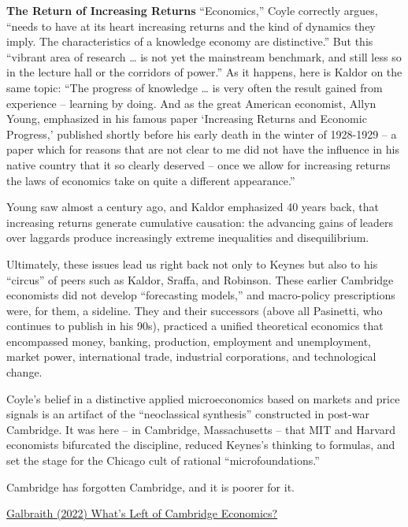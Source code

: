 \documentclass[
]{book}
\begin{document}
\textbf{The Return of Increasing Returns}
``Economics,'' Coyle correctly argues, ``needs to have at its heart increasing returns and the kind of dynamics they imply. The characteristics of a knowledge economy are distinctive.'' But this ``vibrant area of research \ldots{} is not yet the mainstream benchmark, and still less so in the lecture hall or the corridors of power.'' As it happens, here is Kaldor on the same topic: ``The progress of knowledge \ldots{} is very often the result gained from experience -- learning by doing. And as the great American economist, Allyn Young, emphasized in his famous paper `Increasing Returns and Economic Progress,' published shortly before his early death in the winter of 1928-1929 -- a paper which for reasons that are not clear to me did not have the influence in his native country that it so clearly deserved -- once we allow for increasing returns the laws of economics take on quite a different appearance.''

Young saw almost a century ago, and Kaldor emphasized 40 years back, that increasing returns generate cumulative causation: the advancing gains of leaders over laggards produce increasingly extreme inequalities and disequilibrium.

Ultimately, these issues lead us right back not only to Keynes but also to his ``circus'' of peers such as Kaldor, Sraffa, and Robinson. These earlier Cambridge economists did not develop ``forecasting models,'' and macro-policy prescriptions were, for them, a sideline. They and their successors (above all Pasinetti, who continues to publish in his 90s), practiced a unified theoretical economics that encompassed money, banking, production, employment and unemployment, market power, international trade, industrial corporations, and technological change.

Coyle's belief in a distinctive applied microeconomics based on markets and price signals is an artifact of the ``neoclassical synthesis'' constructed in post-war Cambridge. It was here -- in Cambridge, Massachusetts -- that MIT and Harvard economists bifurcated the discipline, reduced Keynes's thinking to formulas, and set the stage for the Chicago cult of rational ``microfoundations.''

Cambridge has forgotten Cambridge, and it is poorer for it.

\href{https://www.project-syndicate.org/onpoint/whats-wrong-with-economics-by-james-k-galbraith-2022-01}{Galbraith (2022) What's Left of Cambridge Economics?}
\end{document}
